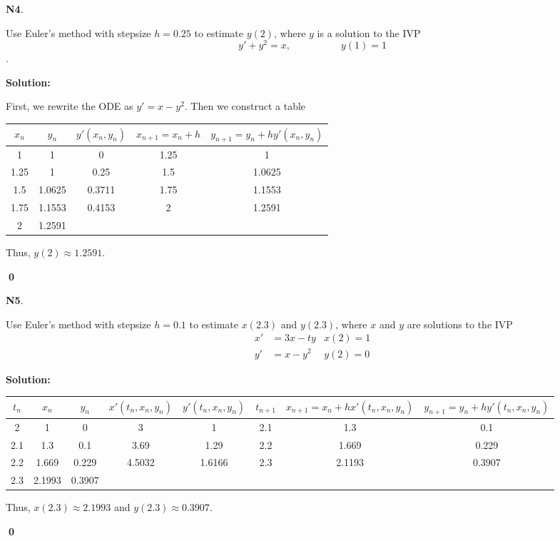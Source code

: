 \documentclass{article}
\newenvironment{problem}[1]
{
  \begin{flushleft}
  \textbf{#1}.
  \ignorespaces
}
{
  \end{flushleft}
}
\newenvironment{solution}
{
  \ignorespaces
  \textbf{Solution:}
}
{
  \ignorespacesafterend
  \begin{flushright}
  {\bfseries \qed}
  \end{flushright}
}
\begin{document}
\begin{problem}{N4}
Use Euler's method with stepsize \(h=0.25\) to estimate \(y(2)\), where \(y\) is a solution to the IVP
\[y'+y^2=x,\hspace{5em}y(1)=1\].
\end{problem}
\begin{solution}
First, we rewrite the ODE as \(y'=x-y^2\).  Then we construct a table
\begin{center}
\begin{tabular}{c|c|c|c|c}
\(x_n\) & \(y_n\) & \(y'(x_n,y_n)\) & \(x_{n+1}=x_n+h\) & \(y_{n+1}=y_n+hy'(x_n,y_n)\) \\ \hline \hline
1 & 1 & 0 & 1.25 & 1 \\ \hline
1.25 & 1 & 0.25 & 1.5  & 1.0625 \\\hline
1.5 & 1.0625 & 0.3711 & 1.75 & 1.1553  \\\hline
1.75 & 1.1553 & 0.4153  & 2 & 1.2591 \\\hline
2 & 1.2591 &  &  &  \\\hline
\end{tabular}
\end{center}
Thus, \(y(2) \approx 1.2591\).
\end{solution}

\begin{problem}{N5}
Use Euler's method with stepsize \(h=0.1\) to estimate \(x(2.3)\) and \(y(2.3)\), where \(x\) and \(y\) are solutions to the IVP
\begin{align*}
x'&=3x-ty & x(2)=1 \\
y'&=x-y^2 & y(2)=0 
\end{align*}
\end{problem}
\begin{solution}
\begin{center}
\begin{tabular}{c|c|c||c|c||c|c|c}
\(t_n\) & \(x_n\) & \(y_n\) & \(x'(t_n,x_n,y_n)\) &\(y'(t_n,x_n,y_n)\) & \(t_{n+1}\) & \(x_{n+1}=x_n+hx'(t_n,x_n,y_n)\) & \(y_{n+1}=y_n+hy'(t_n,x_n,y_n)\) \\ \hline \hline
2 & 1 & 0  & 3 & 1 & 2.1 & 1.3 & 0.1\\ \hline
2.1 & 1.3 &0.1 & 3.69 & 1.29 & 2.2 & 1.669  & 0.229 \\ \hline
2.2 & 1.669 & 0.229 & 4.5032 & 1.6166 & 2.3 & 2.1193 & 0.3907 \\ \hline
2.3 & 2.1993 & 0.3907 & & & & & \\ \hline
\end{tabular}
\end{center}
Thus, \(x(2.3) \approx 2.1993\) and  \(y(2.3) \approx 0.3907\).
\end{solution}
\end{document}
